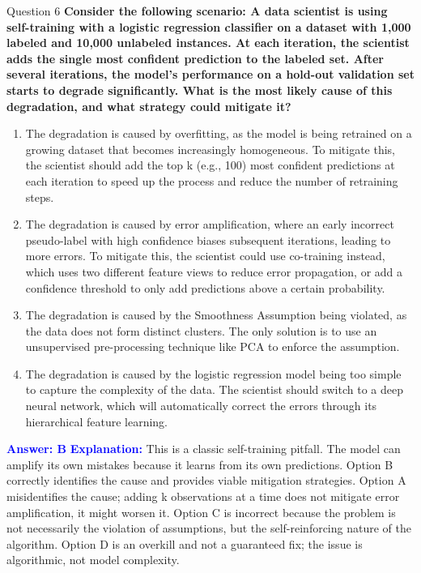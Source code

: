 \documentclass[8pt]{beamer}  %
\begin{document}
	\begin{frame}{Question 6}
		\textbf{Consider the following scenario: A data scientist is using self-training with a logistic regression classifier on a dataset with 1,000 labeled and 10,000 unlabeled instances. At each iteration, the scientist adds the single most confident prediction to the labeled set. After several iterations, the model's performance on a hold-out validation set starts to degrade significantly. What is the most likely cause of this degradation, and what strategy could mitigate it?}
		\begin{enumerate}
			\item The degradation is caused by overfitting, as the model is being retrained on a growing dataset that becomes increasingly homogeneous. To mitigate this, the scientist should add the top k (e.g., 100) most confident predictions at each iteration to speed up the process and reduce the number of retraining steps.
			\item The degradation is caused by error amplification, where an early incorrect pseudo-label with high confidence biases subsequent iterations, leading to more errors. To mitigate this, the scientist could use co-training instead, which uses two different feature views to reduce error propagation, or add a confidence threshold to only add predictions above a certain probability.
			\item The degradation is caused by the Smoothness Assumption being violated, as the data does not form distinct clusters. The only solution is to use an unsupervised pre-processing technique like PCA to enforce the assumption.
			\item The degradation is caused by the logistic regression model being too simple to capture the complexity of the data. The scientist should switch to a deep neural network, which will automatically correct the errors through its hierarchical feature learning.
		\end{enumerate}
		\vspace{0.2cm}
		\textcolor{blue}{\textbf{Answer: B}}
		\vspace{0.2cm}
		\textcolor{blue}{\textbf{Explanation:}} This is a classic self-training pitfall. The model can amplify its own mistakes because it learns from its own predictions. Option B correctly identifies the cause and provides viable mitigation strategies. Option A misidentifies the cause; adding k observations at a time does not mitigate error amplification, it might worsen it. Option C is incorrect because the problem is not necessarily the violation of assumptions, but the self-reinforcing nature of the algorithm. Option D is an overkill and not a guaranteed fix; the issue is algorithmic, not model complexity.
	\end{frame}
	
\end{document}
